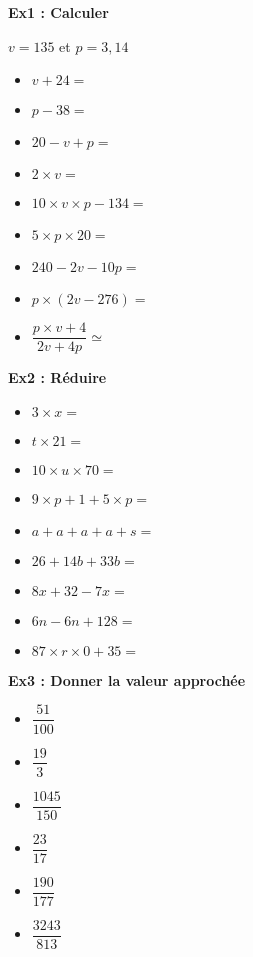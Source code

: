 \begin{multicols}{3}

\textbf{Ex1 : Calculer}

$v = 135$ et $p = 3,14$

\begin{itemize}[label={$\bullet$}]
  \item $v + 24 = $ \dotfill
  \item $p - 38 = $ \dotfill
  \item $20 - v + p= $ \dotfill
  \item $2 \times v = $ \dotfill
  \item $10 \times v \times p - 134 = $ \dotfill
  \item $5 \times  p \times 20 = $ \dotfill
  \item $240 - 2v - 10p = $ \dotfill
  \item $p \times (2v - 276) = $ \dotfill
  \item $\dfrac{p \times v + 4}{2v + 4p} \simeq$ \dotfill
\end{itemize} \columnbreak 

\textbf{Ex2 : Réduire}

\begin{itemize}[label={$\bullet$}]
  \item $ 3 \times x = $ \dotfill
  \item $ t \times 21 = $ \dotfill
  \item $ 10 \times  u \times 70 = $ \dotfill
  \item $ 9 \times p + 1 + 5 \times p = $ \dotfill
  \item $ a + a + a + a + s = $ \dotfill
  \item $ 26 + 14b + 33b = $ \dotfill
  \item $ 8x + 32 - 7x = $ \dotfill
  \item $ 6n - 6n + 128 = $ \dotfill
  \item $ 87 \times r \times 0 + 35 = $ \dotfill
\end{itemize} \columnbreak 

\textbf{Ex3 : Donner la valeur approchée}

\begin{itemize}[label={$\bullet$}]
  \item $ \dfrac{51}{100}    $ \dotfill \\
  \item $ \dfrac{19}{3}     $ \dotfill \\ 
  \item $ \dfrac{1045}{150}   $ \dotfill \\
  \item $ \dfrac{23}{17}    $ \dotfill \\
  \item $ \dfrac{190}{177}    $ \dotfill \\
  \item $ \dfrac{3243}{813} $ \dotfill \\
\end{itemize}

\end{multicols}

